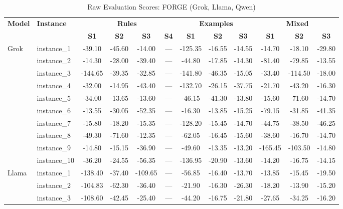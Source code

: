 \documentclass[sigconf]{acmart}
\begin{document}
\begin{table}[htbp]
\centering
\caption{Raw Evaluation Scores: FORGE (Grok, Llama, Qwen)}
\label{tab:raw-others-best}
\scriptsize
\begin{tabular}{ll cccc ccc ccc}
\toprule
\textbf{Model} & \textbf{Instance} & \multicolumn{4}{c}{\textbf{Rules}} & \multicolumn{3}{c}{\textbf{Examples}} & \multicolumn{3}{c}{\textbf{Mixed}} \\
\cmidrule(lr){3-6}\cmidrule(lr){7-9}\cmidrule(lr){10-12}
 & & \textbf{S1} & \textbf{S2} & \textbf{S3} & \textbf{S4} & \textbf{S1} & \textbf{S2} & \textbf{S3} & \textbf{S1} & \textbf{S2} & \textbf{S3} \\
\midrule
Grok & instance\_1 & -39.10 & -45.60 & -14.00 & --- & -125.35 & -16.55 & -14.55 & -14.70 & -18.10 & -29.80 \\
 & instance\_2 & -14.30 & -28.00 & -39.40 & --- & -44.80 & -17.85 & -14.30 & -81.40 & -79.85 & -13.55 \\
 & instance\_3 & -144.65 & -39.35 & -32.85 & --- & -141.80 & -46.35 & -15.05 & -33.40 & -114.50 & -18.00 \\
 & instance\_4 & -32.00 & -14.95 & -43.40 & --- & -132.70 & -26.15 & -37.75 & -21.70 & -43.20 & -16.30 \\
 & instance\_5 & -34.00 & -13.65 & -13.60 & --- & -46.15 & -41.30 & -13.80 & -15.60 & -71.60 & -14.70 \\
 & instance\_6 & -13.55 & -30.05 & -52.35 & --- & -16.30 & -13.85 & -15.25 & -79.15 & -31.85 & -41.35 \\
 & instance\_7 & -15.80 & -18.20 & -15.35 & --- & -128.20 & -15.45 & -14.70 & -44.75 & -38.50 & -46.25 \\
 & instance\_8 & -49.30 & -71.60 & -12.35 & --- & -62.05 & -16.45 & -15.60 & -38.60 & -16.70 & -14.70 \\
 & instance\_9 & -14.80 & -15.15 & -36.90 & --- & -49.60 & -13.35 & -13.20 & -165.45 & -103.50 & -14.80 \\
 & instance\_10 & -36.20 & -24.55 & -56.35 & --- & -136.95 & -20.90 & -13.60 & -14.20 & -16.75 & -14.15 \\
\midrule
Llama & instance\_1 & -138.40 & -37.40 & -109.65 & --- & -56.85 & -16.40 & -13.70 & -13.85 & -15.45 & -19.50 \\
 & instance\_2 & -104.83 & -62.30 & -36.40 & --- & -21.90 & -16.30 & -26.30 & -18.20 & -13.90 & -15.20 \\
 & instance\_3 & -108.60 & -42.45 & -25.40 & --- & -44.20 & -16.75 & -21.80 & -27.65 & -34.25 & -16.20 \\

\end{tabular}
\end{table}
\end{document}
